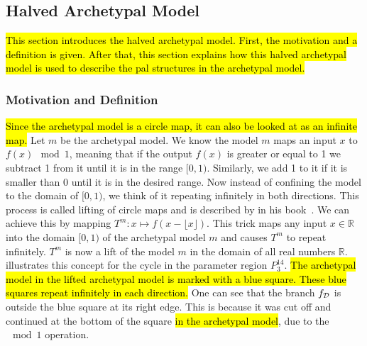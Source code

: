 \subsection{Halved Archetypal Model}
\label{sec:add.add.halved}

\hl{
	This section introduces the halved archetypal model.
	First, the motivation and a definition is given.
	After that, this section explains how this halved archetypal model is used to describe the \gls{pal} structures in the archetypal model.
}

\subsubsection{Motivation and Definition}

\hl{
	Since the archetypal model is a circle map, it can also be looked at as an infinite map.
}
Let $m$ be the archetypal model.
We know the model $m$ maps an input $x$ to $f(x) \mod 1$, meaning that if the output $f(x)$ is greater or equal to 1 we subtract 1 from it until it is in the range $[0, 1)$.
Similarly, we add 1 to it if it is smaller than 0 until it is in the desired range.
Now instead of confining the model to the domain of $[0, 1)$, we think of it repeating infinitely in both directions.
This process is called lifting of circle maps and is described by  in his book~\cite{devaney2021introduction}.
We can achieve this by mapping $T^m: x \mapsto f(x - \lfloor x \rfloor)$.
This trick maps any input $x \in \mathbb{R}$ into the domain $[0, 1)$ of the archetypal model $m$ and causes $T^m$ to repeat infinitely.
$T^m$ is now a lift of the model $m$ in the domain of all real numbers $\mathbb{R}$.
 illustrates this concept for the cycle in the parameter region $P^{14}_3$.
\hl{
	The archetypal model in the lifted archetypal model is marked with a blue square.
	These blue squares repeat infinitely in each direction.
}
One can see that the branch $f_{\mathcal{D}}$ is outside the blue square at its right edge.
This is because it was cut off and continued at the bottom of the square \hl{in the archetypal model}, due to the $\mod 1$ operation.

